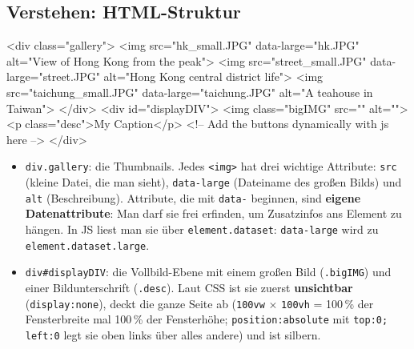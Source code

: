 \documentclass[a4paper,11pt]{article}
\begin{document}
\subsection{Verstehen: HTML-Struktur}
\begin{htmlcode}[firstnumber=9]
    <div class="gallery">
       <img src="hk_small.JPG" data-large="hk.JPG" alt="View of Hong Kong from the peak">
     <img src="street_small.JPG" data-large="street.JPG" alt="Hong Kong central district life">
     <img src="taichung_small.JPG" data-large="taichung.JPG" alt="A teahouse in Taiwan">
  </div>
     <div id="displayDIV">
         <img class="bigIMG" src="" alt="">
         <p class="desc">My Caption</p>
         <!-- Add the buttons dynamically with js here -->
     </div>
\end{htmlcode}
\begin{itemize}
\item \texttt{div.gallery}: die Thumbnails. Jedes \texttt{<img>} hat drei wichtige Attribute: \texttt{src} (kleine
      Datei, die man sieht), \texttt{data-large} (Dateiname des großen Bilds) und \texttt{alt} (Beschreibung).
      Attribute, die mit \texttt{data-} beginnen, sind \textbf{eigene Datenattribute}: Man darf sie frei erfinden,
      um Zusatzinfos ans Element zu hängen. In JS liest man sie über \lstinline|element.dataset|:
      \texttt{data-large} wird zu \lstinline|element.dataset.large|.
\item \texttt{div\#displayDIV}: die Vollbild-Ebene mit einem großen Bild (\texttt{.bigIMG}) und einer
      Bildunterschrift (\texttt{.desc}). Laut CSS ist sie zuerst \textbf{unsichtbar} (\texttt{display:none}), deckt
      die ganze Seite ab (\texttt{100vw} $\times$ \texttt{100vh} = 100\,\% der Fensterbreite mal 100\,\% der Fensterhöhe;
      \texttt{position:absolute} mit \texttt{top:0; left:0} legt sie oben links über alles andere) und ist silbern.
\end{itemize}
\end{document}
